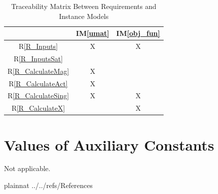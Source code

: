 \documentclass[12pt]{article}
\newcommand{\iref}[1]{IM\ref{#1}}
\newcommand{\rref}[1]{R\ref{#1}}
\begin{document}
\begin{table}[h!]
\centering
\begin{tabular}{|c|c|c|}
\hline
	& \iref{umat}& \iref{obj_fun} \\
\hline
\rref{R_Inputs}     &X &X \\ \hline
\rref{R_InputsSat}    & & \\ \hline
\rref{R_CalculateMag}   &X & \\ \hline
\rref{R_CalculateAct}     &X & \\ \hline 
\rref{R_CalculateSing}       &X &X \\ \hline
\rref{R_CalculateX}   & &X \\ 
\hline
\end{tabular}
\caption{Traceability Matrix Between Requirements and Instance Models}
\label{Table:R_trace}
\end{table}

\newpage

\section{Values of Auxiliary Constants}
Not applicable.

\newpage

 {plainnat}
 {../../refs/References}
\end{document}

